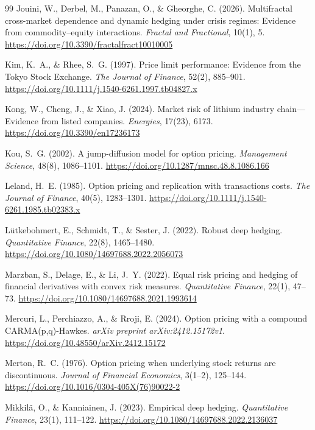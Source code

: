 \documentclass[11pt,a4paper]{article}
\begin{document}
\begin{thebibliography}{99}
Jouini, W., Derbel, M., Panazan, O., \& Gheorghe, C. (2026).
Multifractal cross-market dependence and dynamic hedging under crisis regimes: Evidence from commodity--equity interactions.
\emph{Fractal and Fractional}, 10(1), 5.
\url{https://doi.org/10.3390/fractalfract10010005}

Kim, K.~A., \& Rhee, S.~G. (1997).
Price limit performance: Evidence from the Tokyo Stock Exchange.
\emph{The Journal of Finance}, 52(2), 885--901.
\url{https://doi.org/10.1111/j.1540-6261.1997.tb04827.x}

Kong, W., Cheng, J., \& Xiao, J. (2024).
Market risk of lithium industry chain---Evidence from listed companies.
\emph{Energies}, 17(23), 6173.
\url{https://doi.org/10.3390/en17236173}

Kou, S.~G. (2002).
A jump-diffusion model for option pricing.
\emph{Management Science}, 48(8), 1086--1101.
\url{https://doi.org/10.1287/mnsc.48.8.1086.166}

Leland, H.~E. (1985).
Option pricing and replication with transactions costs.
\emph{The Journal of Finance}, 40(5), 1283--1301.
\url{https://doi.org/10.1111/j.1540-6261.1985.tb02383.x}

L\"{u}tkebohmert, E., Schmidt, T., \& Sester, J. (2022).
Robust deep hedging.
\emph{Quantitative Finance}, 22(8), 1465--1480.
\url{https://doi.org/10.1080/14697688.2022.2056073}

Marzban, S., Delage, E., \& Li, J.~Y. (2022).
Equal risk pricing and hedging of financial derivatives with convex risk measures.
\emph{Quantitative Finance}, 22(1), 47--73.
\url{https://doi.org/10.1080/14697688.2021.1993614}

Mercuri, L., Perchiazzo, A., \& Rroji, E. (2024).
Option pricing with a compound CARMA(p,q)-Hawkes.
\emph{arXiv preprint arXiv:2412.15172v1}.
\url{https://doi.org/10.48550/arXiv.2412.15172}

Merton, R.~C. (1976).
Option pricing when underlying stock returns are discontinuous.
\emph{Journal of Financial Economics}, 3(1--2), 125--144.
\url{https://doi.org/10.1016/0304-405X(76)90022-2}

Mikkil\"{a}, O., \& Kanniainen, J. (2023).
Empirical deep hedging.
\emph{Quantitative Finance}, 23(1), 111--122.
\url{https://doi.org/10.1080/14697688.2022.2136037}


\end{thebibliography}
\end{document}
